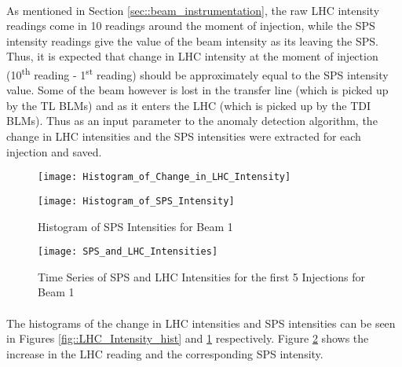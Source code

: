 \paragraph{ }As mentioned in Section \ref{sec::beam_instrumentation}, the raw \acs{LHC} intensity readings come in 10 readings around the moment of injection, while the \acs{SPS} intensity readings give the value of the beam intensity as its leaving the SPS. Thus, it is expected that change in \acs{LHC} intensity at the moment of injection (10\textsuperscript{th} reading - 1\textsuperscript{st} reading) should be approximately equal to the \acs{SPS} intensity value. Some of the beam however is lost in the transfer line (which is picked up by the \acs{TL} \acs{BLM}s) and as it enters the \acs{LHC} (which is picked up by the \acs{TDI} \acs{BLM}s). Thus as an input parameter to the anomaly detection algorithm, the change in \acs{LHC} intensities and the \acs{SPS} intensities were extracted for each injection and saved.

\begin{figure}[!t]
	\begin{minipage}[b]{0.475\linewidth}
		\centering
		\texttt{[image: Histogram\_of\_Change\_in\_LHC\_Intensity]}
		\caption[LHC Intensity Histogram]{Histogram of Change in LHC Intensities for Beam 1}
		\label{fig::LHC_Intensity_hist}
	\end{minipage}	
	\hspace{0.25cm}
	\begin{minipage}[b]{0.475\linewidth}
		\centering
		\texttt{[image: Histogram\_of\_SPS\_Intensity]}
		\caption[SPS Intensity Histogram]{Histogram of SPS Intensities for Beam 1}
		\label{fig::SPS_Intensity_hist}
	\end{minipage}	
\end{figure}

\begin{figure}[t]
	\centering
	\texttt{[image: SPS\_and\_LHC\_Intensities]}
	\caption[SPS and LHC Intensities]{Time Series of SPS and LHC Intensities for the first 5 Injections for Beam 1}
	\label{fig::SPS_and_LHC}
\end{figure} 

\paragraph{ }The histograms of the change in \acs{LHC} intensities and \acs{SPS} intensities can be seen in Figures \ref{fig::LHC_Intensity_hist} and \ref{fig::SPS_Intensity_hist} respectively. Figure \ref{fig::SPS_and_LHC} shows the increase in the \acs{LHC} reading and the corresponding \acs{SPS} intensity.

